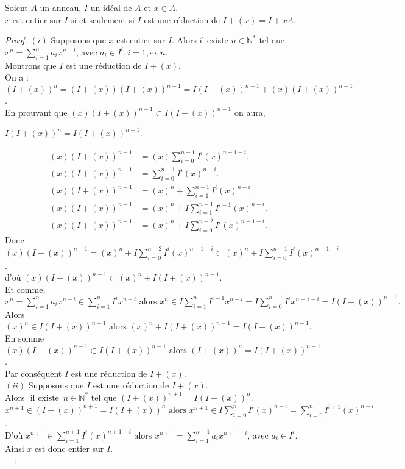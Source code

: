 \begin{maproposition}
	Soient $A$ un anneau, $I$ un idéal de $A$ et $x \in A$.\\
	$x$ est entier sur $I$ si et seulement si $I$ est une réduction de $I + (x) = I +xA $.
\end{maproposition}
\begin{proof}
	$(i)$ Supposons que $x$ est entier sur $I$. Alors il existe $n \in \mathbb{N^*}$ tel que $x^n = \displaystyle \sum_{i=1}^{n}{a_i x^{n-i}}$, avec $a_i \in I^i, i=1, \cdots ,n$.\\
	Montrons que $I$ est une réduction de $I + (x)$.\\
	On a : $(I+(x))^n = (I+(x))(I+(x))^{n-1}= I(I+(x))^{n-1} + (x)(I+(x))^{n-1}$.\\
	En prouvant que $(x)(I+(x))^{n-1} \subset I(I+(x))^{n-1}$ on aura,
	\begin{center}
		$I(I+(x))^{n} = I(I+(x))^{n-1}$.
	\end{center}
	\begin{align*}
		(x)(I+(x))^{n-1} &= (x)\displaystyle \sum_{i=0}^{n-1}{I^i (x)^{n-1-i}}.\\
		(x)(I+(x))^{n-1} &= \displaystyle \sum_{i=0}^{n-1}{I^i (x)^{n-i}}.\\
		(x)(I+(x))^{n-1} &= (x)^n + \displaystyle \sum_{i=1}^{n-1}{I^i (x)^{n-i}}.\\
		(x)(I+(x))^{n-1} &= (x)^n + I\displaystyle \sum_{i=1}^{n-1}{I^{i-1} (x)^{n-i}}.\\
		(x)(I+(x))^{n-1} &= (x)^n + I\displaystyle \sum_{i=0}^{n-2}{I^i (x)^{n-1-i}}.
	\end{align*}
	Donc $(x)(I+(x))^{n-1} = (x)^n + I\displaystyle \sum_{i=0}^{n-2}{I^i (x)^{n-1-i}} \subset (x)^n +I \displaystyle \sum_{i=0}^{n-1}{I^i (x)^{n-1-i}}$.\\
	d'où $(x)(I+(x))^{n-1} \subset (x)^n + I(I+(x))^{n-1}$.\\ Et comme, \\$x^n = \displaystyle \sum_{i=1}^{n}{a_i x^{n-i}} \in \displaystyle \sum_{i=1}^{n}{I^i x^{n-i}} \text{ alors } x^n \in I\displaystyle \sum_{i=1}^{n}{I^{i-1} x^{n-i}} = I\displaystyle \sum_{i=0}^{n-1}{I^i x^{n-1-i}} =I(I+(x))^{n-1}.$\\ Alors $(x)^n \in I(I+(x))^{n-1} \text{ alors } (x)^n + I(I+(x))^{n-1} = I(I+(x))^{n-1}$.\\
	En somme $(x)(I+(x))^{n-1} \subset I(I+(x))^{n-1} \text{ alors } (I+(x))^{n} = I(I+(x))^{n-1}$.\\
	Par conséquent $I$ est une réduction de $I + (x)$.\\
	$(ii)$ Supposons que $I$ est une réduction de $I + (x)$.\\
	Alors $\text{ il existe } \, n \in \mathbb{N^*}$ tel que $(I + (x))^{n+1} = I(I + (x))^{n}$.\\
	$x^{n+1} \in (I + (x))^{n+1} = I(I + (x))^{n} \text{ alors } x^{n+1} \in I\displaystyle \sum_{i=0}^{n}{I^i (x)^{n-i}} = \displaystyle \sum_{i=0}^{n}{I^{i+1} (x)^{n-i}}$.\\
	D'où $x^{n+1} \in \displaystyle \sum_{i=1}^{n+1}{I^i (x)^{n+1-i}} \text{ alors } x^{n+1} =  \displaystyle \sum_{i=1}^{n+1}{a_i x^{n+1-i}}$, avec $a_i \in I^i$. Ainsi $x$ est donc entier sur $I$.\\
\end{proof}
